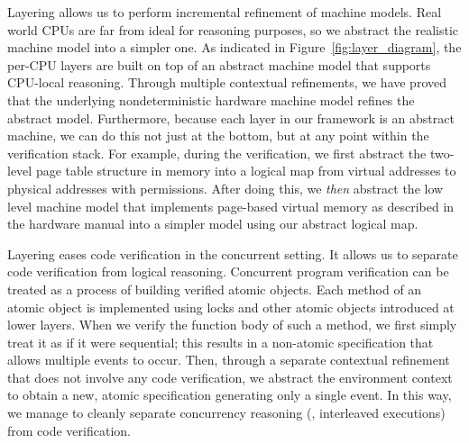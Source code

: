 Layering allows us to perform incremental refinement of machine
  models. Real world CPUs are far from ideal for reasoning
purposes, so we abstract the realistic
machine model into a simpler one.
As indicated in Figure~\ref{fig:layer_diagram}, the per-CPU layers are built on top
of an abstract machine model that supports CPU-local reasoning. Through
multiple contextual refinements, we have proved that the underlying
nondeterministic hardware machine model refines the abstract model. Furthermore, 
because each layer in our framework
is an abstract machine, we can do this not just at
the bottom, but at any point within the verification stack. For example, 
during the \cCTOS{} verification, we first abstract the two-level page table structure
in memory into a logical map from virtual addresses to physical addresses
with permissions. After doing this, we \emph{then} abstract the low level machine 
model that implements page-based virtual memory as described in the hardware 
manual into a simpler model using our abstract logical map.

Layering eases code verification in the concurrent setting.
It allows us to separate code verification from logical reasoning.
Concurrent program verification can be treated as a process of building
verified atomic objects. Each method of an atomic object is implemented using
locks and other atomic objects introduced at lower layers.
When we verify the function body of such a method, we first simply treat it as 
if it were sequential; this results in a non-atomic specification that allows
multiple events to occur. Then, through a separate contextual refinement
that does not involve any code verification, we abstract the environment
context to obtain a new, atomic specification generating only a single event.
In this way, we manage to cleanly separate concurrency reasoning 
(\eg, interleaved executions) from code verification.

